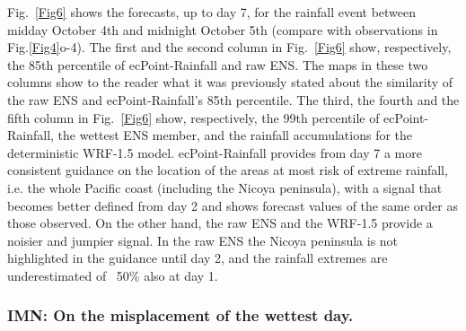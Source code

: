 \documentclass[twocol]{ametsocV5} %
\begin{document}
Fig.~\ref{Fig6} shows the forecasts, up to day 7, for the rainfall event between midday October 4th and midnight October 5th (compare with observations in Fig.\ref{Fig4}o-4). The first and the second column in Fig.~\ref{Fig6} show, respectively, the 85th percentile of ecPoint-Rainfall and raw ENS. The maps in these two columns show to the reader what it was previously stated about the similarity of the raw ENS and ecPoint-Rainfall's 85th percentile. The third, the fourth and the fifth column in Fig.~\ref{Fig6} show, respectively, the 99th percentile of ecPoint-Rainfall, the wettest ENS member, and the rainfall accumulations for the deterministic WRF-1.5 model. ecPoint-Rainfall provides from day 7 a more consistent guidance on the location of the areas at most risk of extreme rainfall, i.e. the whole Pacific coast (including the Nicoya peninsula), with a signal that becomes better defined from day 2 and shows forecast values of the same order as those observed. On the other hand, the raw ENS and the WRF-1.5 provide a noisier and jumpier signal. In the raw ENS the Nicoya peninsula is not highlighted in the guidance until day 2, and the rainfall extremes are underestimated of ~50\% also at day 1. 


\subsubsection{IMN: On the misplacement of the wettest day.}
\end{document}
